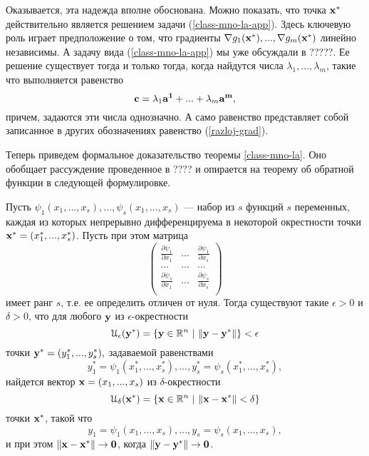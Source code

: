     Оказывается, эта надежда вполне обоснована. Можно показать, что точка $\mathbf{x^{*}}$
    действительно является решением задачи (\ref{class-mno-la-app}).
    Здесь ключевую роль играет предположение о том, что градиенты
    $\nabla g_{1}(\mathbf{x^{*}}),...,\nabla g_{m}(\mathbf{x^{*}})$
    линейно независимы. А задачу вида (\ref{class-mno-la-app}) мы
    уже обсуждали в ?????. Ее решение существует тогда и только
    тогда, когда найдутся числа $\lambda_{1},...,\lambda_{m}$, такие
    что выполняется равенство
    \[\mathbf{c}=\lambda_{1}\mathbf{a^{1}}+...+\lambda_{m}\mathbf{a^{m}},\]
    причем, задаются эти числа однозначно.
    А само равенство представляет собой записанное в других обозначениях равенство
    (\ref{razloj-grad}).

    Теперь приведем формальное доказательство теоремы
    \ref{class-mno-la}. Оно обобщает рассуждение проведенное в ???? и
    опирается на теорему об обратной функции в следующей формулировке.

\begin{teo} 
    Пусть $\psi_{1}(x_{1},...,x_{s}),...,\psi_{s}(x_{1},...,x_{s})$
    --- набор из $s$ функций $s$ переменных, каждая из которых непрерывно
    дифференцируема в некоторой окрестности точки
    $\mathbf{x^{*}}=(x^{*}_{1},...,x^{*}_{s})$.
    Пусть при этом матрица
    \[\left(
        \begin{array}{ccc}
          \frac{\partial\psi_{1}}{\partial x_{1}} & ... & \frac{\partial\psi_{1}}{\partial x_{s}} \\
          ... & ... & ... \\
          \frac{\partial\psi_{s}}{\partial x_{1}} & ... & \frac{\partial\psi_{s}}{\partial x_{s}} \\
        \end{array}
      \right)
\]
    имеет ранг $s$, т.е. ее определить отличен от нуля. Тогда
    существуют такие $\epsilon>0$ и $\delta>0$, что для любого
    $\mathbf{y}$ из $\epsilon$-окрестности
    \[\mathcal{U}_{\epsilon}(\mathbf{y^{*}})=\{\mathbf{y}\in\mathbb{R}^{n} \ | \ \|\mathbf{y}-\mathbf{y^{*}}\|\}<\epsilon\]
     точки
    $\mathbf{y^{*}}=(y^{*}_{1},...,y^{*}_{s}),$
    задаваемой равенствами
    \[y^{*}_{1}=\psi_{1}(x^{*}_{1},...,x^{*}_{s}),...,y^{*}_{s}
    =\psi_{s}(x^{*}_{1},...,x^{*}_{s}),\]
    найдется вектор $\mathbf{x}=(x_{1},...,x_{s})$ из $\delta$-окрестности
    \[\mathcal{U}_{\delta}(\mathbf{x^{*}})=\{\mathbf{x}\in\mathbb{R}^{n} \ | \ \|\mathbf{x}-\mathbf{x^{*}}\|<\delta\}\]
    точки $\mathbf{x^{*}}$, такой что
    \[y_{1}=\psi_{1}(x_{1},...,x_{s}),...,y_{s}
    =\psi_{s}(x_{1},...,x_{s}),\]
    и при этом $\|\mathbf{x}-\mathbf{x^{*}}\|\rightarrow\mathbf{0}$, когда
    $\|\mathbf{y}-\mathbf{y^{*}}\|\rightarrow\mathbf{0}$.
\end{teo}



